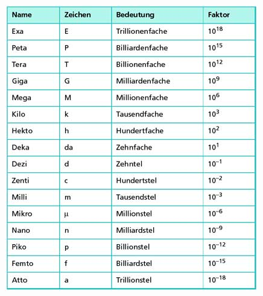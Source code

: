 \documentclass[11pt]{article}
\begin{document}
\begin{minipage}{0.33\textwidth}
\includegraphics[scale=0.40]{Zehnerpotenzen.jpg}

\end{minipage}%

\newpage
\end{document}
